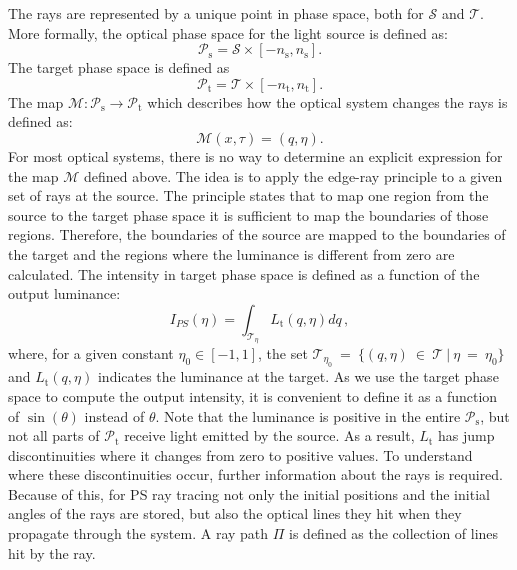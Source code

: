 The rays are represented by a unique point in phase space, both for $\mathcal{S}$ and $\mathcal{T}$.
More formally, the optical phase space for the light source is defined as: \begin{equation}
\mathcal{P}_\textrm{s}=\mathcal{S}\times[-n_\textrm{s},n_\textrm{s}] .\end{equation}
The target phase space is defined as \begin{equation}\mathcal{P}_\textrm{t}=\mathcal{T}\times[-n_\textrm{t},n_\textrm{t}] .\end{equation}
The map $\mathcal{M}:\mathcal{P}_{\textrm{s}}\rightarrow\mathcal{P}_{\textrm{t}}$ which describes how the optical system changes the rays is defined as:
\begin{equation}\label{M}
\mathcal{M}(x,\tau)=(q,\eta).
\end{equation}
For most optical systems, there is no way to determine an explicit expression for the map $\mathcal{M}$ defined above.
The idea is to apply the edge-ray principle \cite{Ries:2} to a given set of rays at the source.
The principle states that to map one region from the source to the target phase space it is sufficient to map the boundaries of those regions.
Therefore, the boundaries of the source are mapped to the boundaries of the target and the regions where the luminance is different from zero are calculated.
The intensity in target phase space is defined as a function of the output luminance:
\begin{equation}\label{I(eta)}
I_{PS}(\eta) = \int_{\mathcal{T}_{\eta}} L_{\textrm{t}}(q, \eta) dq  \,,
\end{equation}
where, for a given constant $\eta_0 \in [-1,1]$, the set $\mathcal{T}_{\eta_0}~=~\{(q, \eta)~\in~ \mathcal{T}\:|\: \eta ~=~ \eta_0 \}$ and $L_{\textrm{t}}(q, \eta)$ indicates the luminance at the target.
As we use the target phase space to compute the output intensity, it is convenient to define it as a function of $\sin(\theta)$ instead of $\theta$.
Note that the luminance is positive in the entire $\mathcal{P}_\textrm{s}$, but not all parts of $\mathcal{P}_\textrm{t}$ receive light emitted by the source.
As a result, $L_\textrm{t}$ has jump discontinuities where it changes from zero to positive values.
To understand where these discontinuities occur, further information about the rays is required.
Because of this, for PS ray tracing not only the initial positions and the initial angles of the rays are stored,
 but also the optical lines they hit when they propagate through the system.
A ray path $\Pi$ is defined as the collection of lines hit by the ray. %
